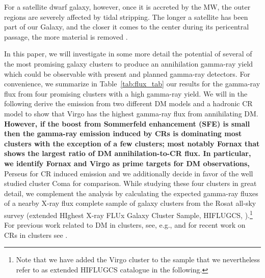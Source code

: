 \documentclass[10pt,aps,pra,reprint,amsmath,amsfonts,amssymb,showpacs,nofootinbib,floatfix]{revtex4-1}
\def\C#1{{\bf #1}}
\begin{document}
For a satellite dwarf galaxy, however, once it is accreted by the MW,
the outer regions are severely affected by tidal stripping. The longer
a satellite has been part of our Galaxy, and the closer it comes to
the center during its pericentral passage, the more material is
removed \cite{2004MNRAS.355..819G}.

In this paper, we will investigate in some more detail the potential
of several of the most promising galaxy clusters to produce an
annihilation gamma-ray yield which could be observable with present
and planned gamma-ray detectors. For convenience, we summarize in
Table~\ref{tab:flux_tab} our results for the gamma-ray flux from four
promising clusters with a high gamma-ray yield. We will in the
following derive the emission from two different DM models and a
hadronic CR model to show that Virgo has the highest gamma-ray flux
from annihilating DM. \C{However, if the boost from Sommerfeld
  enhancement (SFE) is small then the gamma-ray emission induced by
  CRs is dominating most clusters with the exception of a few
  clusters; most notably Fornax that shows the largest ratio of DM
  annihilation-to-CR flux. In particular, we identify Fornax and Virgo
  as prime targets for DM observations,} Perseus for CR induced
emission and we additionally decide in favor of the well studied
cluster Coma for comparison. While studying these four clusters in
great detail, we complement the analysis by calculating the expected
gamma-ray fluxes of a nearby X-ray flux complete sample of galaxy
clusters from the Rosat all-sky survey (extended HIghest X-ray FLUx
Galaxy Cluster Sample, HIFLUGCS,
\cite{2002ApJ...567..716R,2007A&A...466..805C}).\footnote{Note that
  we have added the Virgo cluster to the sample that we nevertheless
  refer to as extended HIFLUGCS catalogue in the following.}  For
previous work related to DM in clusters, see, e.g.,
\cite{2006A&A...455...21C,2009PhRvD..80b3005J,2011arXiv1104.3530S,2011ApJ...726L...6C,2010JCAP...05..025A}
and for recent work on CRs in clusters see
\cite{2010MNRAS.409..449P,2011MNRAS.410..127B,2008MNRAS.385.1211P,2009JCAP...08..002K,2010MNRAS.407.1565D}.
\end{document}
